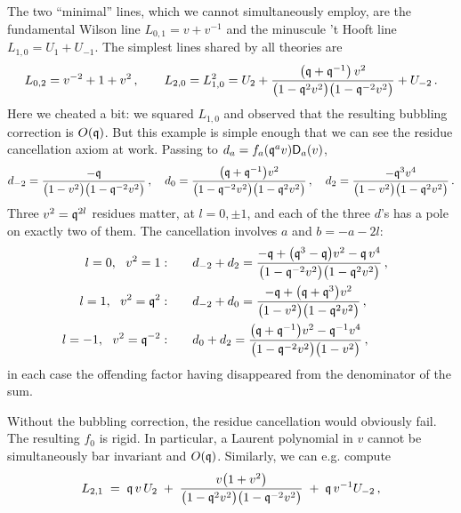 \documentclass[12pt]{amsart}
\begin{document}
The two ``minimal'' lines, which we cannot simultaneously employ, are the fundamental Wilson line $L_{0,1} = v + v^{-1}$ 
and the minuscule 't Hooft line $L_{1,0} = U_1 + U_{-1}$. The simplest lines shared by all theories are 
\begin{equation}\label{eq:su2thooft}
	L_{0,2} = v^{-2}+1+v^{2} \,,\qquad
	L_{2,0}= L_{1,0}^2 = U_2 + \frac{\big(\mathfrak{q}+\mathfrak{q}^{-1}\big)\,v^{2}}
	           {\big(1-\mathfrak{q}^{2}v^{2}\big)\big(1-\mathfrak{q}^{-2}v^{2}\big)} + U_{-2} \,.
\end{equation}
Here we cheated a bit: we squared $L_{1,0}$ and observed that the resulting bubbling correction is $O(\mathfrak{q})$. But this example is simple enough that we can see the residue cancellation axiom at work. Passing to $d_a = f_a(\mathfrak{q}^a v)\mathsf{D}_a(v)$,
\begin{equation}\label{eq:su2dform}
	d_{-2} = \frac{-\mathfrak{q}}{\big(1-v^{2}\big)\big(1-\mathfrak{q}^{-2}v^{2}\big)} \,,\quad
	d_{0} = \frac{\big(\mathfrak{q}+\mathfrak{q}^{-1}\big)v^{2}}
	              {\big(1-\mathfrak{q}^{-2}v^{2}\big)\big(1-\mathfrak{q}^{2}v^{2}\big)} \,,\quad
	d_{2} = \frac{-\mathfrak{q}^{3}v^{4}}{\big(1-v^{2}\big)\big(1-\mathfrak{q}^{2}v^{2}\big)} \,.
\end{equation}
Three $v^{2} = \mathfrak{q}^{2l}$ residues matter, at $l=0,\pm1$, and each of the three $d$'s has a pole on
exactly two of them. The cancellation involves $a$ and $b=-a-2l$:
\begin{align}\label{eq:su2res}
	l=0,\ \ v^{2}=1:&\qquad d_{-2}+d_{2}
	  = \frac{-\mathfrak{q} + \big(\mathfrak{q}^{3}-\mathfrak{q}\big)v^{2} - \mathfrak{q}\,v^{4}}
	         {\big(1-\mathfrak{q}^{-2}v^{2}\big)\big(1-\mathfrak{q}^{2}v^{2}\big)} \,, \cr
	l=1,\ \ v^{2}=\mathfrak{q}^{2}:&\qquad d_{-2}+d_{0}
	  = \frac{-\mathfrak{q} + \big(\mathfrak{q}+\mathfrak{q}^{3}\big)v^{2}}
	         {\big(1-v^{2}\big)\big(1-\mathfrak{q}^{2}v^{2}\big)} \,, \cr
	l=-1,\ \ v^{2}=\mathfrak{q}^{-2}:&\qquad d_{0}+d_{2}
	  = \frac{\big(\mathfrak{q}+\mathfrak{q}^{-1}\big)v^{2}-\mathfrak{q}^{-1}v^{4}}
	         {\big(1-\mathfrak{q}^{-2}v^{2}\big)\big(1-v^{2}\big)} \,,
\end{align}
in each case the offending factor having disappeared from the denominator of the
sum.

Without the bubbling correction, the residue cancellation would obviously fail. The resulting $f_0$ is rigid. 
In particular, a Laurent polynomial in $v$ cannot be simultaneously bar invariant and $O(\mathfrak{q})$. 
Similarly, we can e.g. compute
\begin{equation}\label{eq:su2dyonic}
	L_{2,1} \;=\; \mathfrak{q}\,v\,U_2
	 \;+\; \frac{v\big(1+v^{2}\big)}
	            {\big(1-\mathfrak{q}^{2}v^{2}\big)\big(1-\mathfrak{q}^{-2}v^{2}\big)}
	 \;+\; \mathfrak{q}\,v^{-1}U_{-2} \,,
\end{equation}
 
\end{document}
